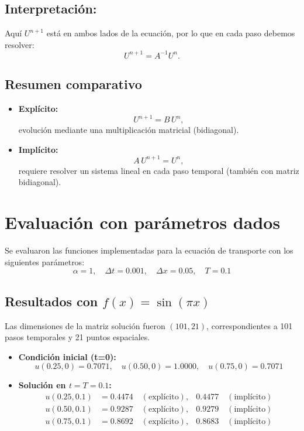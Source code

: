 \documentclass[12pt,a4paper]{article}
\begin{document}
\subsection*{Interpretación:}
Aquí $U^{n+1}$ está en ambos lados de la ecuación, por lo que en cada paso debemos resolver:
\[
U^{n+1} = A^{-1} U^n.
\]

\subsection{Resumen comparativo}

\begin{itemize}
    \item \textbf{Explícito:}  
    \[
    U^{n+1} = B\,U^n,
    \]
    evolución mediante una multiplicación matricial (bidiagonal).

    \item \textbf{Implícito:}  
    \[
    A\,U^{n+1} = U^n,
    \]
    requiere resolver un sistema lineal en cada paso temporal (también con matriz bidiagonal).
\end{itemize}

\section{Evaluación con parámetros dados}

Se evaluaron las funciones implementadas para la ecuación de transporte con los siguientes parámetros:
\[
\alpha = 1, \quad \Delta t = 0.001, \quad \Delta x = 0.05, \quad T = 0.1
\]

\subsection{Resultados con $f(x) = \sin(\pi x)$}

Las dimensiones de la matriz solución fueron $(101,21)$, correspondientes a 101 pasos temporales y 21 puntos espaciales.

\begin{itemize}
    \item \textbf{Condición inicial (t=0):}
    \[
    u(0.25,0) = 0.7071, \quad u(0.50,0) = 1.0000, \quad u(0.75,0) = 0.7071
    \]

    \item \textbf{Solución en $t = T = 0.1$:}
    \begin{align*}
    u(0.25,0.1) &= 0.4474 \quad (\text{explícito}), & 0.4477 \quad (\text{implícito}) \\
    u(0.50,0.1) &= 0.9287 \quad (\text{explícito}), & 0.9279 \quad (\text{implícito}) \\
    u(0.75,0.1) &= 0.8692 \quad (\text{explícito}), & 0.8683 \quad (\text{implícito})
    \end{align*}
\end{itemize}
\end{document}
